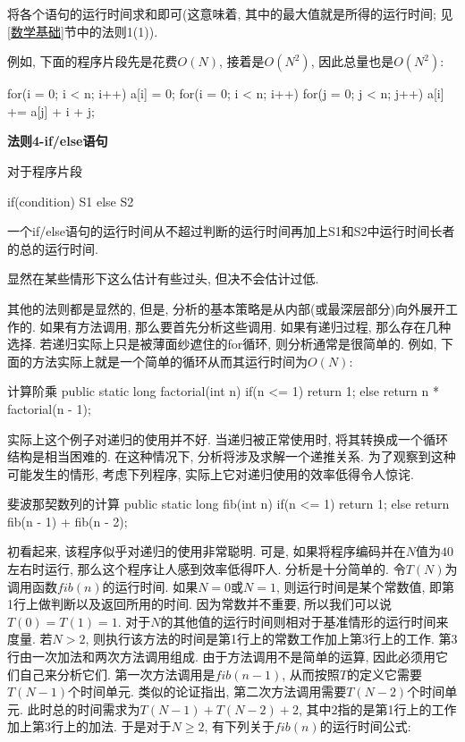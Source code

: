 \documentclass[oneside]{ctexbook}
\begin{document}
{将各个语句的运行时间求和即可(这意味着, 其中的最大值就是所得的运行时间; 见\ref{数学基础}节中的法则1(1)).

例如, 下面的程序片段先是花费$O(N)$, 接着是$O(N^2)$, 因此总量也是$O(N^2)$:

\begin{myjava}{}{}
for(i = 0; i < n; i++)
    a[i] = 0;
for(i = 0; i < n; i++)
    for(j = 0; j < n; j++)
        a[i] += a[j] + i + j;
\end{myjava}

\textbf{法则4-if/else语句}

对于程序片段

\begin{myjava}{}{}
if(condition)
    S1
else
    S2
\end{myjava}

一个if/else语句的运行时间从不超过判断的运行时间再加上S1和S2中运行时间长者的总的运行时间.

显然在某些情形下这么估计有些过头, 但决不会估计过低.

其他的法则都是显然的, 但是, 分析的基本策略是从内部(或最深层部分)向外展开工作的. 如果有方法调用, 那么要首先分析这些调用. 如果有递归过程, 那么存在几种选择. 若递归实际上只是被薄面纱遮住的for循环, 则分析通常是很简单的. 例如, 下面的方法实际上就是一个简单的循环从而其运行时间为$O(N)$:

\begin{myjava}{}{计算阶乘}
public static long factorial(int n) {
    if(n <= 1)
        return 1;
    else
        return n * factorial(n - 1);
}
\end{myjava}

实际上这个例子对递归的使用并不好. 当递归被正常使用时, 将其转换成一个循环结构是相当困难的. 在这种情况下, 分析将涉及求解一个递推关系. 为了观察到这种可能发生的情形, 考虑下列程序, 实际上它对递归使用的效率低得令人惊诧.

\begin{myjava}{}{斐波那契数列的计算}
public static long fib(int n) {
    if(n <= 1)
        return 1;
    else
        return fib(n - 1) + fib(n - 2);
}
\end{myjava}

初看起来, 该程序似乎对递归的使用非常聪明. 可是, 如果将程序编码并在$N$值为$40$左右时运行, 那么这个程序让人感到效率低得吓人. 分析是十分简单的. 令$T(N)$为调用函数$fib(n)$的运行时间. 如果$N=0$或$N=1$, 则运行时间是某个常数值, 即第1行上做判断以及返回所用的时间. 因为常数并不重要, 所以我们可以说$T(0)=T(1)=1$. 对于$N$的其他值的运行时间则相对于基准情形的运行时间来度量. 若$N>2$, 则执行该方法的时间是第1行上的常数工作加上第3行上的工作. 第3行由一次加法和两次方法调用组成. 由于方法调用不是简单的运算, 因此必须用它们自己来分析它们. 第一次方法调用是$fib(n-1)$, 从而按照$T$的定义它需要$T(N-1)$个时间单元. 类似的论证指出, 第二次方法调用需要$T(N-2)$个时间单元. 此时总的时间需求为$T(N-1)+T(N-2)+2$, 其中$2$指的是第1行上的工作加上第3行上的加法. 于是对于$N\geq 2$, 有下列关于$fib(n)$的运行时间公式:

}
\end{document}
